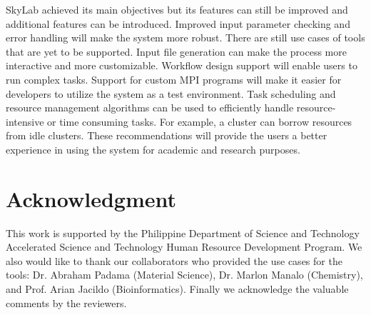 SkyLab achieved its main objectives but its features can still be improved and additional features can be introduced. Improved input parameter checking and error handling will make the system more robust. There are still use cases of tools that are yet to be supported. Input file generation can make the process more interactive and more customizable.  Workflow design support will enable users to run complex tasks. Support for custom MPI programs will make it easier for developers to utilize the system as a test environment. Task scheduling and resource management algorithms can be used to efficiently handle resource-intensive or time consuming tasks. For example, a cluster can borrow resources from idle clusters. These recommendations will provide the users a better experience in using the system for academic and research purposes. 




\section*{Acknowledgment}
This work is supported by the Philippine Department of Science and Technology Accelerated Science and Technology Human Resource Development Program. We also would like to thank our collaborators who provided the use cases for the tools: Dr. Abraham Padama (Material Science), Dr. Marlon Manalo (Chemistry), and Prof. Arian Jacildo (Bioinformatics). Finally we acknowledge the valuable comments by the reviewers.




